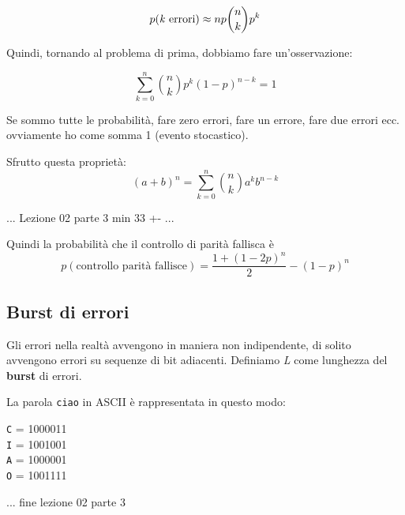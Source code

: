\begin{equation}
p(\text{\textit{k} errori})\approx np \binom{n}{k}p^k
\end{equation}

Quindi, tornando al problema di prima, dobbiamo fare un'osservazione:

\begin{equation}
	\sum_{k=0}^{n} \binom{n}{k} p^k(1-p)^{n-k} = 1
\end{equation}

Se sommo tutte le probabilità, fare zero errori, fare un errore, fare due errori ecc. ovviamente ho come somma 1 (evento stocastico).

Sfrutto questa proprietà:
\begin{equation}
(a+b)^n = \sum_{k=0}^{n} \binom{n}{k} a^kb^{n-k}
\end{equation}

\bigskip
\bigskip

... 
Lezione 02 parte 3 min 33 +-
...

\bigskip
\bigskip
Quindi la probabilità che il controllo di parità fallisca è
\begin{equation}
p(\text{controllo parità fallisce}) = \frac{1 + (1-2p)^n}{2}-(1-p)^n
\end{equation}

\subsection*{Burst di errori}

Gli errori nella realtà avvengono in maniera non indipendente, di solito avvengono errori su sequenze di bit adiacenti.
Definiamo \textit{L} come lunghezza del \textbf{burst} di errori.

La parola \texttt{ciao} in ASCII è rappresentata in questo modo:
\begin{center}
	\texttt{C} = 1000011\\
	\texttt{I} = 1001001\\
	\texttt{A} = 1000001\\
	\texttt{O} = 1001111
\end{center}

... fine lezione 02 parte 3








